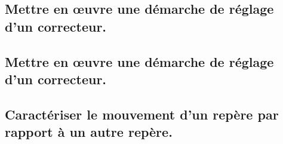 \documentclass[10pt,fleqn]{book}
\newcommand{\repRel}{../..}
\newcommand{\repStyle}{\repRel/Style}
\newcommand{\td}{fichier_td}
\newcommand{\repExos}{\repRel/ExercicesCompetences}
\newcommand{\repExo}{dossier}
\begin{document}
\renewcommand{\repExo}{\repExos/C2_MettreEnOeuvreDemarche/C2_03_PerformancesSLCI_Stabilite/64_EPAS}
\renewcommand{\td}{64_EPAS}
\graphicspath{{\repStyle/png/}{\repExo/images/}}


\subsection{Mettre en œuvre une démarche de réglage d’un correcteur.} 

\subsection{Mettre en œuvre une démarche de réglage d’un correcteur.} 

\renewcommand{\repExo}{\repExos/C2_MettreEnOeuvreDemarche/C2_04_Correcteurs/65_Eclipse}
\renewcommand{\td}{65_Eclipse}
\graphicspath{{\repStyle/png/}{\repExo/images/}}


\renewcommand{\repExo}{\repExos/C2_MettreEnOeuvreDemarche/C2_04_Correcteurs/65_Eclipse_02}
\renewcommand{\td}{65_Eclipse_02}
\graphicspath{{\repStyle/png/}{\repExo/images/}}


\renewcommand{\repExo}{\repExos/C2_MettreEnOeuvreDemarche/C2_04_Correcteurs/65_Eclipse_03}
\renewcommand{\td}{65_Eclipse_03}
\graphicspath{{\repStyle/png/}{\repExo/images/}}


\renewcommand{\repExo}{\repExos/C2_MettreEnOeuvreDemarche/C2_04_Correcteurs/66_Micromanipulateur}
\renewcommand{\td}{66_Micromanipulateur}
\graphicspath{{\repStyle/png/}{\repExo/images/}}


\renewcommand{\repExo}{\repExos/C2_MettreEnOeuvreDemarche/C2_04_Correcteurs/67_PompeTurbo}
\renewcommand{\td}{67_PompeTurbo}
\graphicspath{{\repStyle/png/}{\repExo/images/}}


\renewcommand{\repExo}{\repExos/C2_MettreEnOeuvreDemarche/C2_04_Correcteurs/68_Roburoc}
\renewcommand{\td}{68_Roburoc}
\graphicspath{{\repStyle/png/}{\repExo/images/}}


\renewcommand{\repExo}{\repExos/C2_MettreEnOeuvreDemarche/C2_04_Correcteurs/70_Hublex}
\renewcommand{\td}{70_Hublex}
\graphicspath{{\repStyle/png/}{\repExo/images/}}


\subsection{Caractériser le mouvement d’un repère par rapport à un autre repère.} 
\end{document}
